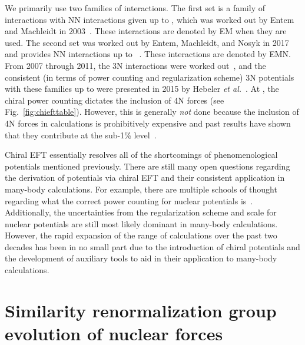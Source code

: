 We primarily use two families of interactions.
The first set is a family of interactions with NN interactions given up to \nthreelo{},
which was worked out by Entem and Machleidt in 2003~\cite{Ente03n3lonn}.
These interactions are denoted by EM when they are used.
The second set was worked out by Entem, Machleidt, and Nosyk in 2017
and provides NN interactions up to \nfourlo{}~\cite{Ente17n4lonn}.\@
These interactions are denoted by EMN.\@
From 2007 through 2011, the 3N interactions were worked out~\cite{Ishi07chi3n,Bern07chi3n1,Bern11chi3n2},
and the consistent
(in terms of power counting and regularization scheme)
3N potentials with these families up to \nthreelo{}
were presented in 2015 by Hebeler \textit{et al.}~\cite{Hebe15n3lo3n}.
At \nthreelo{}, the chiral power counting dictates the inclusion of 4N forces
(see Fig.~\ref{fig:chiefttable}).
However, this is generally \textit{not} done
because the inclusion of 4N forces in calculations is prohibitively expensive
and past results have shown that they contribute at the sub-1\%
level~\cite{Tews12neutronmatter4n,Schu18fourbody}.

Chiral EFT essentially resolves all of the shortcomings of phenomenological potentials mentioned previously.
There are still many open questions regarding the derivation of potentials via chiral EFT
and their consistent application in many-body calculations.
For example, there are multiple schools of thought regarding
what the correct power counting
for nuclear potentials is~\cite{Bean01pertchieft,Nogg05pertchieft,Epel18hownottorenormalize}.
Additionally, the uncertainties from the regularization scheme and scale for nuclear potentials
are still most likely dominant in many-body calculations.
However, the rapid expansion of the range of \abinitio{} calculations over the past two decades has been in no small part
due to the introduction of chiral potentials and the development of auxiliary tools to aid in their application
to many-body calculations.

\section{Similarity renormalization group evolution of nuclear forces}\label{sec:srg}

